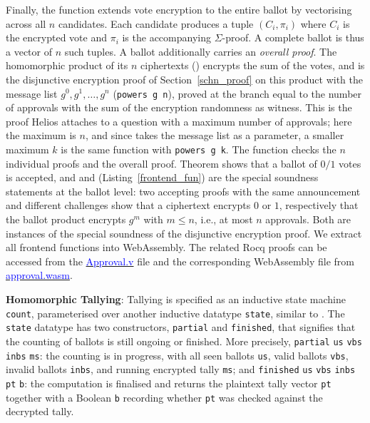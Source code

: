 \documentclass[sigconf,anonymous,review]{acmart}
\begin{document}
Finally, the function \texttt{} extends vote encryption to the entire ballot by vectorising across all $n$ candidates. Each candidate 
produces a tuple $(C_i, \pi_i)$ where $C_i$ is the encrypted vote and $\pi_i$ is the accompanying $\Sigma$-proof. A complete ballot is thus a vector of $n$ such tuples. A ballot additionally carries an \emph{overall proof}. The homomorphic product of its $n$ ciphertexts (\texttt{}) encrypts the sum of the votes, and \texttt{} is the disjunctive encryption proof of Section~\ref{schn_proof} on this product with the message list $g^0, g^1, \ldots, g^n$ (\texttt{powers g n}), proved at the branch equal to the number of approvals with the sum of the encryption randomness as witness. This is the proof Helios attaches to a question with a maximum number of approvals; here the maximum is $n$, and since \texttt{} takes the message list as a parameter, a smaller maximum $k$ is the same function with \texttt{powers g k}. The function \texttt{} checks the $n$ individual proofs and the overall proof. Theorem \texttt{} shows that a ballot of $0/1$ votes is accepted, and \texttt{} and \texttt{} (Listing~\ref{frontend_fun}) are the special soundness statements at the ballot level: two accepting proofs with the same announcement and different challenges show that a ciphertext encrypts $0$ or $1$, respectively that the ballot product encrypts $g^m$ with $m \le n$, i.e., at most $n$ approvals. Both are instances of the special soundness of the disjunctive encryption proof. We extract all frontend functions into WebAssembly. The related Rocq proofs can be accessed from the \href{https://anonymous.4open.science/r/SigmaProtocol-EBA5/src/Frontend/Approval.v}{\textcolor{blue}{Approval.v}} file and the corresponding WebAssembly file from \href{https://anonymous.4open.science/r/SigmaProtocol-EBA5/src/Wasm/approval.wasm}{\textcolor{blue}{approval.wasm}}.





\textbf{Homomorphic Tallying}: Tallying is specified as an inductive state machine \texttt{count}, parameterised 
over another inductive datatype \texttt{state}, similar to \cite{10.1007/978-3-319-66107-0_26}. The \texttt{state} datatype has two constructors, \texttt{partial} and \texttt{finished}, that signifies that the counting of ballots is still ongoing or finished. More precisely, \texttt{partial} \texttt{us} \texttt{vbs} \texttt{inbs} \texttt{ms}: the counting is in progress, with all seen ballots \texttt{us}, valid ballots \texttt{vbs}, invalid ballots \texttt{inbs}, and running encrypted tally \texttt{ms}; and \texttt{finished} \texttt{us} \texttt{vbs} \texttt{inbs} \texttt{pt} \texttt{b}: the computation is finalised and returns the plaintext tally vector \texttt{pt} together with a Boolean \texttt{b} recording whether \texttt{pt} was checked against the decrypted tally.
\end{document}
